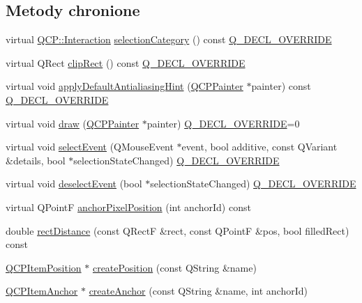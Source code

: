 \subsection*{Metody chronione}
\begin{DoxyCompactItemize}
\item 
virtual \hyperlink{namespace_q_c_p_a2ad6bb6281c7c2d593d4277b44c2b037}{Q\+C\+P\+::\+Interaction} \hyperlink{class_q_c_p_abstract_item_aceb5f99c361cf023c7cbe7339ea29571}{selection\+Category} () const \hyperlink{qcustomplot_8hh_a42cc5eaeb25b85f8b52d2a4b94c56f55}{Q\+\_\+\+D\+E\+C\+L\+\_\+\+O\+V\+E\+R\+R\+I\+DE}
\item 
virtual Q\+Rect \hyperlink{class_q_c_p_abstract_item_a6ad60000f29afe11035e1f791dcbd45a}{clip\+Rect} () const \hyperlink{qcustomplot_8hh_a42cc5eaeb25b85f8b52d2a4b94c56f55}{Q\+\_\+\+D\+E\+C\+L\+\_\+\+O\+V\+E\+R\+R\+I\+DE}
\item 
virtual void \hyperlink{class_q_c_p_abstract_item_a5579ce9ec7cad202499886b042448b10}{apply\+Default\+Antialiasing\+Hint} (\hyperlink{class_q_c_p_painter}{Q\+C\+P\+Painter} $\ast$painter) const \hyperlink{qcustomplot_8hh_a42cc5eaeb25b85f8b52d2a4b94c56f55}{Q\+\_\+\+D\+E\+C\+L\+\_\+\+O\+V\+E\+R\+R\+I\+DE}
\item 
virtual void \hyperlink{class_q_c_p_abstract_item_a007fdab79c935a5da5aa04a21d268c18}{draw} (\hyperlink{class_q_c_p_painter}{Q\+C\+P\+Painter} $\ast$painter) \hyperlink{qcustomplot_8hh_a42cc5eaeb25b85f8b52d2a4b94c56f55}{Q\+\_\+\+D\+E\+C\+L\+\_\+\+O\+V\+E\+R\+R\+I\+DE}=0
\item 
virtual void \hyperlink{class_q_c_p_abstract_item_aa4b969c58797f39c9c0b6c07c7869d17}{select\+Event} (Q\+Mouse\+Event $\ast$event, bool additive, const Q\+Variant \&details, bool $\ast$selection\+State\+Changed) \hyperlink{qcustomplot_8hh_a42cc5eaeb25b85f8b52d2a4b94c56f55}{Q\+\_\+\+D\+E\+C\+L\+\_\+\+O\+V\+E\+R\+R\+I\+DE}
\item 
virtual void \hyperlink{class_q_c_p_abstract_item_af9093798cb07a861dcc73f93ca16c0c1}{deselect\+Event} (bool $\ast$selection\+State\+Changed) \hyperlink{qcustomplot_8hh_a42cc5eaeb25b85f8b52d2a4b94c56f55}{Q\+\_\+\+D\+E\+C\+L\+\_\+\+O\+V\+E\+R\+R\+I\+DE}
\item 
virtual Q\+PointF \hyperlink{class_q_c_p_abstract_item_ae56a01594e57709e7be44206fd65345f}{anchor\+Pixel\+Position} (int anchor\+Id) const 
\item 
double \hyperlink{class_q_c_p_abstract_item_a57cf4b9cecbfeb5f9e267481ecfe10cd}{rect\+Distance} (const Q\+RectF \&rect, const Q\+PointF \&pos, bool filled\+Rect) const 
\item 
\hyperlink{class_q_c_p_item_position}{Q\+C\+P\+Item\+Position} $\ast$ \hyperlink{class_q_c_p_abstract_item_a75036d39c4d4e2e1a7dd145fff915d32}{create\+Position} (const Q\+String \&name)
\item 
\hyperlink{class_q_c_p_item_anchor}{Q\+C\+P\+Item\+Anchor} $\ast$ \hyperlink{class_q_c_p_abstract_item_af3fc92527802078ca395138748b629a7}{create\+Anchor} (const Q\+String \&name, int anchor\+Id)
\end{DoxyCompactItemize}
